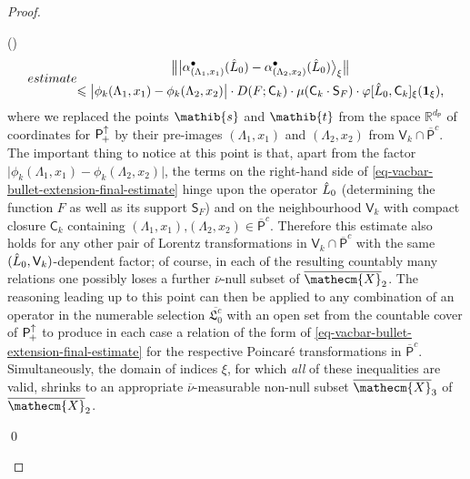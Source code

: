 \documentclass[11pt,twoside,openright]{report}
\theoremstyle{definition}
\theoremstyle{plain}
\theoremstyle{remark}
\theoremstyle{assumption}
\newcommand{\babs}[1]{\bigl\lvert #1 \bigr\rvert}
\newcommand{\bnorm}[1]{\bigl\lVert #1 \bigr\rVert}
\newcommand{\bxiket}[1]{\big\vert #1 \bigr\rangle_\xi}
\newcommand{\Rbb}{\mathbb{R}}
\newcommand{\sib}{\mathib{s}}
\newcommand{\tib}{\mathib{t}}
\newcommand{\Csf}{\mathsf{C}}
\newcommand{\Psf}{\mathsf{P}}
\newcommand{\Ssf}{\mathsf{S}}
\newcommand{\Vsf}{\mathsf{V}}
\newcommand{\unit}{\mathbf{1}}
\newcommand{\Xecmbar}{\overline{\mathecm{X}}}
\newcommand{\nubar}{\overline{\nu}}
\newcommand{\Poin}{\mathsf{P}_{\negthinspace +}^\uparrow}
\newcommand{\abulletLaxone}{\alpha^\bullet_{( \Lambda_1 , x_1 )}}
\newcommand{\abulletLaxtwo}{\alpha^\bullet_{( \Lambda_2 , x_2 )}}
\newcommand{\Pbarcount}{\overline{\mathsf{P}}^c}
\newcommand{\vaccountbar}{\overline{\mathfrak{L}_0^c}}
\newcounter{proofitem}
\newenvironment{prooflist}{\begin{list}{(\roman{proofitem})}%
  {\usecounter{proofitem} \setlength{\topsep}{0ex}%
   \setlength{\parsep}{0.2ex} \setlength{\itemsep}{0.4ex}%
   \setlength{\leftmargin}{0em} \setlength{\itemindent}{0.5em}%
   \setlength{\listparindent}{1em}}}{\qed \end{list}}
\begin{document}
\begin{proof}
\begin{prooflist}
\begin{subequations}
      estimate
      \begin{multline}
        \label{eq-vacbar-bullet-extension-final-estimate}
        \bnorm{\bxiket{\abulletLaxone ( \Hat{L}_0 ) - \abulletLaxtwo (
        \Hat{L}_0 )}} \\ 
        \leqslant \babs{\phi_k ( \Lambda_1 , x_1 ) - \phi_k (
        \Lambda_2 , x_2 )} \cdot D ( F ; \Csf_k ) \cdot \mu ( \Csf_k
        \cdot \Ssf_F ) \cdot \varphi [ \Hat{L}_0 , \Csf_k ]_\xi (
        \unit_\xi ) \text{,}
      \end{multline}
    \end{subequations}
    where we replaced the points $\sib$ and $\tib$ from the space
    $\Rbb^{d_\Psf}$ of coordinates for $\Poin$ by their pre-images $(
    \Lambda_1 , x_1 )$ and $( \Lambda_2 , x_2 )$ from $\Vsf_k \cap
    \Pbarcount$. The important thing to notice at this point is that,
    apart from the factor $\babs{\phi_k ( \Lambda_1 , x_1 ) - \phi_k (
    \Lambda_2 , x_2 )}$, the terms on the right-hand side of
    \eqref{eq-vacbar-bullet-extension-final-estimate} hinge upon the
    operator $\Hat{L}_0$ (determining the function $F$ as well as its
    support $\Ssf_F$) and on the neighbourhood $\Vsf_k$ with compact
    closure $\Csf_k$ containing $( \Lambda_1 , x_1 ) \text{,} (
    \Lambda_2 , x_2 ) \in \Pbarcount$. Therefore this estimate also
    holds for any other pair of Lorentz transformations in $\Vsf_k
    \cap \Pbarcount$ with the same $( \Hat{L}_0 , \Vsf_k )$-dependent
    factor; of course, in each of the resulting countably many
    relations one possibly loses a further $\nubar$-null subset of
    $\Xecmbar_2$. The reasoning leading up to this point can then be
    applied to any combination of an operator in the numerable
    selection $\vaccountbar$ with an open set from the countable cover
    of $\Poin$ to produce in each case a relation of the form of
    \eqref{eq-vacbar-bullet-extension-final-estimate} for the
    respective Poincar\'{e} transformations in
    $\Pbarcount$. Simultaneously, the domain of indices $\xi$, for
    which \emph{all} of these inequalities are valid, shrinks to an
    appropriate $\nubar$-measurable non-null subset $\Xecmbar_3$ of
    $\Xecmbar_2$.


\end{prooflist}
\end{proof}
\end{document}
